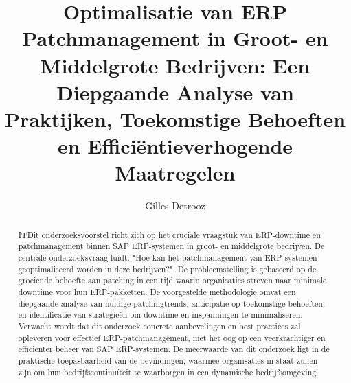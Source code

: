 \documentclass{hogent-article}
\title{Optimalisatie van ERP Patchmanagement in Groot- en Middelgrote Bedrijven: Een Diepgaande Analyse van Praktijken, Toekomstige Behoeften en Efficiëntieverhogende Maatregelen}
\author{Gilles Detrooz}
\begin{document}
\begin{abstract}
ITDit onderzoeksvoorstel richt zich op het cruciale vraagstuk van ERP-downtime en patchmanagement binnen SAP ERP-systemen in groot- en middelgrote bedrijven. De centrale onderzoeksvraag luidt: "Hoe kan het patchmanagement van ERP-systemen geoptimaliseerd worden in deze bedrijven?". De probleemstelling is gebaseerd op de groeiende behoefte aan patching in een tijd waarin organisaties streven naar minimale downtime voor hun ERP-pakketten. De voorgestelde methodologie omvat een diepgaande analyse van huidige patchingtrends, anticipatie op toekomstige behoeften, en identificatie van strategieën om downtime en inspanningen te minimaliseren. Verwacht wordt dat dit onderzoek concrete aanbevelingen en best practices zal opleveren voor effectief ERP-patchmanagement, met het oog op een veerkrachtiger en efficiënter beheer van SAP ERP-systemen. De meerwaarde van dit onderzoek ligt in de praktische toepasbaarheid van de bevindingen, waarmee organisaties in staat zullen zijn om hun bedrijfscontinuïteit te waarborgen in een dynamische bedrijfsomgeving.\end{abstract}

\tableofcontents



\printbibliography[heading=bibintoc]
\end{document}
